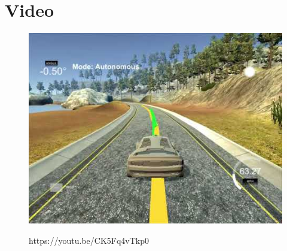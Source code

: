 \section{Video}

\begin{figure}[H]
\centering
    \href{https://www.youtube.com/watch?v=CK5Fq4vTkp0}{\includegraphics[width=0.8\linewidth]{./video_thumbnail.jpg}}
      \vspace{-0.1cm}
\caption{https://youtu.be/CK5Fq4vTkp0}
\label{fig:fig4}
\end{figure}
